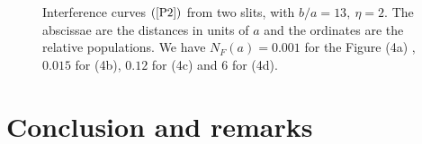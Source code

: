 \documentclass[12pt]{article}   %
\begin{document}
\begin{figure}[h]
\begin{center}
\caption{\label{Fig.3} Interference curves $(\ref{P2})$ from two
slits, with $b/a=13,\ \eta=2$. The abscissae are the distances in
units of $a$ and the ordinates are the relative populations. We
have $N_F(a)=0.001$ for the Figure (4a) , $0.015$ for (4b), $0.12$
for (4c) and $6$ for (4d).}
\end{center}
\end{figure}


\section{Conclusion and remarks}
\end{document}
